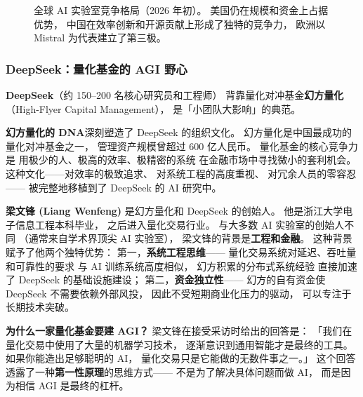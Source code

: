 \begin{figure}[htbp]
\caption{全球 AI 实验室竞争格局（2026 年初）。
美国仍在规模和资金上占据优势，
中国在效率创新和开源贡献上形成了独特的竞争力，
欧洲以 Mistral 为代表建立了第三极。}
\label{fig:ai-lab-landscape}
\end{figure}

\subsubsection{DeepSeek：量化基金的 AGI 野心}

\textbf{DeepSeek}（约 150--200 名核心研究员和工程师）
背靠量化对冲基金\textbf{幻方量化}（High-Flyer Capital Management），
是「小团队大影响」的典范。

\textbf{幻方量化的 DNA}深刻塑造了 DeepSeek 的组织文化。
幻方量化是中国最成功的量化对冲基金之一，
管理资产规模曾超过 600 亿人民币。
量化基金的核心竞争力是
用极少的人、极高的效率、极精密的系统
在金融市场中寻找微小的套利机会。
这种文化——对效率的极致追求、
对系统工程的高度重视、
对冗余人员的零容忍——
被完整地移植到了 DeepSeek 的 AI 研究中。

\textbf{梁文锋 (Liang Wenfeng)}
是幻方量化和 DeepSeek 的创始人。
他是浙江大学电子信息工程本科毕业，
之后进入量化交易行业。
与大多数 AI 实验室的创始人不同
（通常来自学术界顶尖 AI 实验室），
梁文锋的背景是\textbf{工程和金融}。
这种背景赋予了他两个独特优势：
第一，\textbf{系统工程思维}——
量化交易系统对延迟、吞吐量和可靠性的要求
与 AI 训练系统高度相似，
幻方积累的分布式系统经验
直接加速了 DeepSeek 的基础设施建设；
第二，\textbf{资金独立性}——
幻方的自有资金使 DeepSeek 不需要依赖外部风投，
因此不受短期商业化压力的驱动，
可以专注于长期技术突破。

\textbf{为什么一家量化基金要建 AGI？}
梁文锋在接受采访时给出的回答是：
「我们在量化交易中使用了大量的机器学习技术，
逐渐意识到通用智能才是最终的工具。
如果你能造出足够聪明的 AI，
量化交易只是它能做的无数件事之一。」
这个回答透露了一种\textbf{第一性原理}的思维方式——
不是为了解决具体问题而做 AI，
而是因为相信 AGI 是最终的杠杆。

